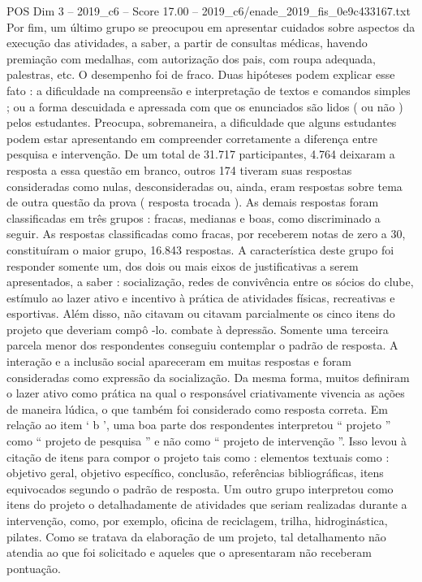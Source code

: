 \begin{textsample}{POS Dim 3 – 2019\_c6 – Score 17.00 – 2019\_c6/enade\_2019\_fis\_0e9c433167.txt}
Por fim, um último grupo se preocupou em apresentar cuidados sobre aspectos da execução das atividades, a saber, a partir de consultas médicas, havendo premiação com medalhas, com autorização dos pais, com roupa adequada, palestras, etc.
O desempenho foi de fraco.
Duas hipóteses podem explicar esse fato : a dificuldade na compreensão e interpretação de textos e comandos simples ; ou a forma descuidada e apressada com que os enunciados são lidos ( ou não ) pelos estudantes.
Preocupa, sobremaneira, a dificuldade que alguns estudantes podem estar apresentando em compreender corretamente a diferença entre pesquisa e intervenção.
De um total de 31.717 participantes, 4.764 deixaram a resposta a essa questão em branco, outros 174 tiveram suas respostas consideradas como nulas, desconsideradas ou, ainda, eram respostas sobre tema de outra questão da prova ( resposta trocada ).
As demais respostas foram classificadas em três grupos : fracas, medianas e boas, como discriminado a seguir.
As respostas classificadas como fracas, por receberem notas de zero a 30, constituíram o maior grupo, 16.843 respostas.
A característica deste grupo foi responder somente um, dos dois ou mais eixos de justificativas a serem apresentados, a saber : socialização, redes de convivência entre os sócios do clube, estímulo ao lazer ativo e incentivo à prática de atividades físicas, recreativas e esportivas.
Além disso, não citavam ou citavam parcialmente os cinco itens do projeto que deveriam compô -lo. combate à depressão.
Somente uma terceira parcela menor dos respondentes conseguiu contemplar o padrão de resposta.
A interação e a inclusão social apareceram em muitas respostas e foram consideradas como expressão da socialização.
Da mesma forma, muitos definiram o lazer ativo como prática na qual o responsável criativamente vivencia as ações de maneira lúdica, o que também foi considerado como resposta correta.
Em relação ao item ‘ b ’, uma boa parte dos respondentes interpretou “ projeto ” como “ projeto de pesquisa ” e não como “ projeto de intervenção ”.
Isso levou à citação de itens para compor o projeto tais como : elementos textuais como : objetivo geral, objetivo específico, conclusão, referências bibliográficas, itens equivocados segundo o padrão de resposta.
Um outro grupo interpretou como itens do projeto o detalhadamente de atividades que seriam realizadas durante a intervenção, como, por exemplo, oficina de reciclagem, trilha, hidroginástica, pilates.
Como se tratava da elaboração de um projeto, tal detalhamento não atendia ao que foi solicitado e aqueles que o apresentaram não receberam pontuação.

\end{textsample}
